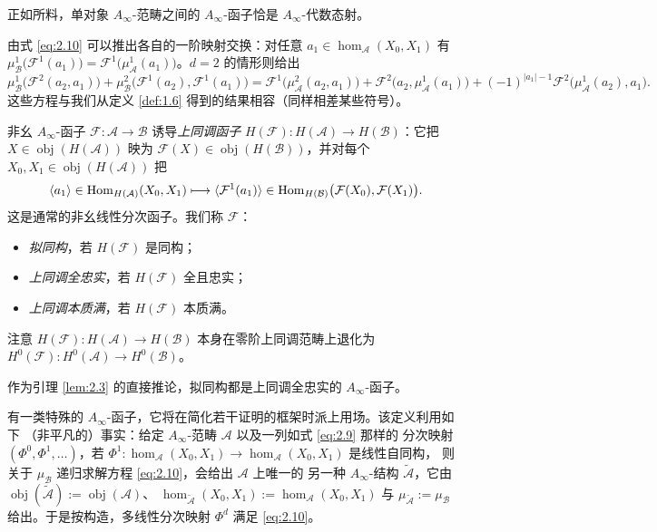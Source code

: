 正如所料，单对象 $A_\infty$-范畴之间的 $A_\infty$-函子恰是 $A_\infty$-代数态射。

由式 \eqref{eq:2.10} 可以推出各自的一阶映射交换：对任意
$a_1\in\hom_{\mathcal A}(X_0,X_1)$ 有
$\mu^1_{\mathcal B}\bigl(\mathcal F^1(a_1)\bigr)=
\mathcal F^1\bigl(\mu^1_{\mathcal A}(a_1)\bigr)$。$d=2$ 的情形则给出
\[
  \mu^1_{\mathcal B}\bigl(\mathcal F^2(a_2,a_1)\bigr)
  +\mu^2_{\mathcal B}\bigl(\mathcal F^1(a_2),\mathcal F^1(a_1)\bigr)
  =\mathcal F^1\bigl(\mu^2_{\mathcal A}(a_2,a_1)\bigr)
  +\mathcal F^2\bigl(a_2,\mu^1_{\mathcal A}(a_1)\bigr)
  +(-1)^{|a_1|-1}\mathcal F^2\bigl(\mu^1_{\mathcal A}(a_2),a_1\bigr).
\]
这些方程与我们从定义 \ref{def:1.6} 得到的结果相容（同样相差某些符号）。

\begin{Def}\label{def:2.8}
非幺 $A_\infty$-函子 $\mathcal F:\mathcal A\to\mathcal B$ 诱导\emph{上同调函子}
$H(\mathcal F):H(\mathcal A)\to H(\mathcal B)$：它把 $X\in
\operatorname{obj}(H(\mathcal A))$ 映为 $\mathcal F(X)\in
\operatorname{obj}(H(\mathcal B))$，并对每个 $X_0,X_1\in
\operatorname{obj}(H(\mathcal A))$ 把
\begin{equation}\label{eq:2.12}
  \langle a_1\rangle\in\operatorname{Hom}_{H(\mathcal A)}(X_0,X_1)
  \longmapsto\langle\mathcal F^1(a_1)\rangle\in
  \operatorname{Hom}_{H(\mathcal B)}\bigl(\mathcal F(X_0),\mathcal F(X_1)\bigr).
\end{equation}
这是通常的非幺线性分次函子。我们称 $\mathcal F$：
\begin{itemize}
  \item \emph{拟同构}，若 $H(\mathcal F)$ 是同构；
  \item \emph{上同调全忠实}，若 $H(\mathcal F)$ 全且忠实；
  \item \emph{上同调本质满}，若 $H(\mathcal F)$ 本质满。
\end{itemize}
注意 $H(\mathcal F):H(\mathcal A)\to H(\mathcal B)$ 本身在零阶上同调范畴上退化为
$H^0(\mathcal F):H^0(\mathcal A)\to H^0(\mathcal B)$。
\end{Def}

作为引理 \ref{lem:2.3} 的直接推论，拟同构都是上同调全忠实的 $A_\infty$-函子。

有一类特殊的 $A_\infty$-函子，它将在简化若干证明的框架时派上用场。该定义利用如下
（非平凡的）事实：给定 $A_\infty$-范畴 $\mathcal A$ 以及一列如式 \eqref{eq:2.9} 那样的
分次映射 $(\Phi^0,\Phi^1,\dots)$，若
$\Phi^1:\hom_{\mathcal A}(X_0,X_1)\to\hom_{\mathcal A}(X_0,X_1)$ 是线性自同构，
则关于 $\mu_{\mathcal B}$ 递归求解方程 \eqref{eq:2.10}，会给出 $\mathcal A$ 上唯一的
另一种 $A_\infty$-结构 $\tilde{\mathcal A}$，它由
$\operatorname{obj}(\tilde{\mathcal A}):=\operatorname{obj}(\mathcal A)$、
$\hom_{\tilde{\mathcal A}}(X_0,X_1):=\hom_{\mathcal A}(X_0,X_1)$ 与
$\mu_{\tilde{\mathcal A}}:=\mu_{\mathcal B}$ 给出。于是按构造，多线性分次映射
$\Phi^d$ 满足 \eqref{eq:2.10}。

